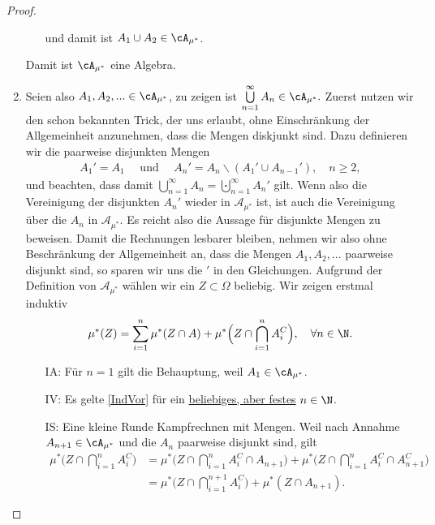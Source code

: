 \begin{proof}
\begin{enumerate}[label=(\alph*)]
\begin{enumerate}[label=(\roman*)]
			und damit ist $A_1\cup A_2 \in \cA_{\mu^{*}}$.
		\end{enumerate}
		Damit ist  $\cA_{\mu^*}$ eine Algebra.
\marginpar{\textcolor{red}{Vorlesung 5}}
	\item Seien also $A_1,A_2,...\in \cA_{\mu^{*}}$, zu zeigen ist $\bigcup\limits_{n=1}^{\infty} A_n \in \cA_{\mu^{*}}.$ Zuerst nutzen wir den schon bekannten Trick, der uns erlaubt, ohne Einschr\"ankung der Allgemeinheit anzunehmen, dass die Mengen diskjunkt sind. Dazu definieren wir die paarweise disjunkten Mengen
	\begin{align*}
		A_1'=A_1\quad \text{ und }\quad A_n'= A_n \backslash (A_1' \cup A_{n-1}'), \quad n \geq 2,
	\end{align*}
	und beachten, dass damit $\bigcup\limits_{n=1}^{\infty} A_n = \bigcupdot\limits_{n=1}^{\infty} A_n'$ gilt. Wenn also die Vereinigung der disjunkten $A_n'$ wieder in $\mathcal A_{\mu^*}$ ist, ist auch die Vereinigung \"uber die $A_n$ in $\mathcal A_{\mu^*}$. Es reicht also die Aussage f\"ur disjunkte Mengen zu beweisen. Damit die Rechnungen lesbarer bleiben, nehmen wir also ohne Beschr\"ankung der Allgemeinheit an, dass die Mengen $A_1, A_2, ...$ paarweise disjunkt sind, so sparen wir uns die $'$ in den Gleichungen. Aufgrund der Definition von $\mathcal A_{\mu^*}$ w\"ahlen wir ein $Z\subset \Omega$ beliebig. Wir zeigen erstmal induktiv 
	\begin{equation}\label{IndVor}
		\mu^{*}(Z)= \sum\limits_{i=1}^{n} \mu^{*}(Z \cap A) + \mu^{*}\Big(Z \cap \bigcap\limits_{i=1}^{n} A_i^C \Big),\quad \forall n \in \N.
	\end{equation}
	\begin{itemize}
		\item [IA:] Für $n=1$ gilt die Behauptung, weil $A_1 \in \cA_{\mu^{*}}$.
		\item [IV:] Es gelte \eqref{IndVor} für ein \underline{beliebiges, aber festes} $n \in \N$.
		\item [IS:] Eine kleine Runde Kampfrechnen mit Mengen. Weil nach Annahme $A_{n+1} \in \cA_{\mu^{*}}$ und die $A_n$ paarweise disjunkt sind, gilt
		\begin{align*}
			\mu^{*}\Big(Z \cap \bigcap\limits_{i=1}^{n} A_i^C \Big)
			&= \mu^{*}\Big(Z \cap \bigcap\limits_{i=1}^{n} A_i^C \cap A_{n+1} \Big) + \mu^{*}\Big(Z \cap \bigcap\limits_{i=1}^{n} A_i^C \cap A_{n+1}^C \Big)\\
			 &= \mu^{*}\Big(Z \cap \bigcap\limits_{i=1}^{n + 1} A_i^C \Big) + \mu^{*}(Z \cap A_{n+1}).
		\end{align*}

\end{itemize}
\end{enumerate}
\end{proof}
